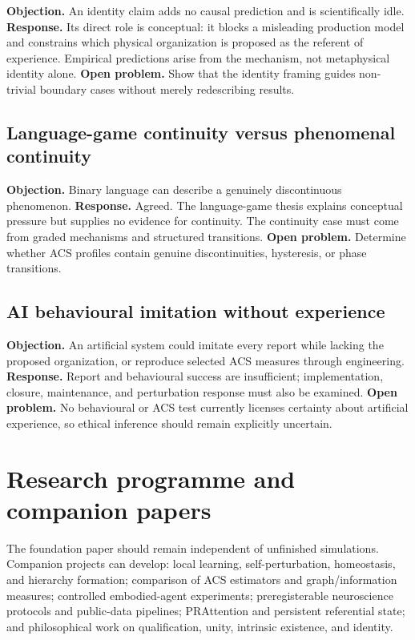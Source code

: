 \documentclass[
  11pt,
  a4paper,
]{article}
\begin{document}
\textbf{Objection.} An identity claim adds no causal prediction and is
scientifically idle. \textbf{Response.} Its direct role is conceptual:
it blocks a misleading production model and constrains which physical
organization is proposed as the referent of experience. Empirical
predictions arise from the mechanism, not metaphysical identity alone.
\textbf{Open problem.} Show that the identity framing guides non-trivial
boundary cases without merely redescribing results.

\subsection{Language-game continuity versus phenomenal
continuity}\label{language-game-continuity-versus-phenomenal-continuity}

\textbf{Objection.} Binary language can describe a genuinely
discontinuous phenomenon. \textbf{Response.} Agreed. The language-game
thesis explains conceptual pressure but supplies no evidence for
continuity. The continuity case must come from graded mechanisms and
structured transitions. \textbf{Open problem.} Determine whether ACS
profiles contain genuine discontinuities, hysteresis, or phase
transitions.

\subsection{AI behavioural imitation without
experience}\label{ai-behavioural-imitation-without-experience}

\textbf{Objection.} An artificial system could imitate every report
while lacking the proposed organization, or reproduce selected ACS
measures through engineering. \textbf{Response.} Report and behavioural
success are insufficient; implementation, closure, maintenance, and
perturbation response must also be examined. \textbf{Open problem.} No
behavioural or ACS test currently licenses certainty about artificial
experience, so ethical inference should remain explicitly uncertain.

\section{Research programme and companion
papers}\label{research-programme-and-companion-papers}

The foundation paper should remain independent of unfinished
simulations. Companion projects can develop: local learning,
self-perturbation, homeostasis, and hierarchy formation; comparison of
ACS estimators and graph/information measures; controlled embodied-agent
experiments; preregisterable neuroscience protocols and public-data
pipelines; PRAttention and persistent referential state; and
philosophical work on qualification, unity, intrinsic existence, and
identity.
\end{document}

